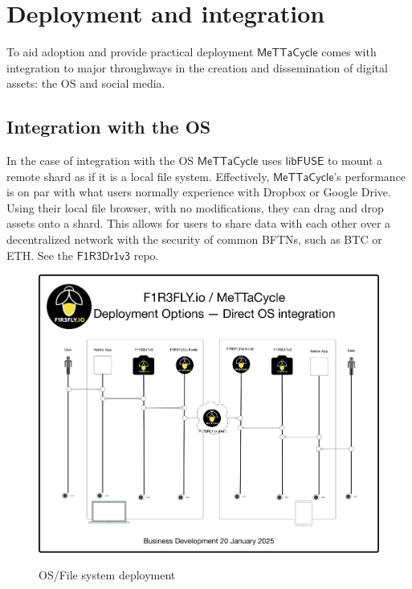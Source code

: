 \documentclass{article}
\newcommand{\MC}{\mathsf{MeTTaCycle}}
\newcommand{\FD}{\mathsf{F1R3Dr1v3}}
\begin{document}
\section{Deployment and integration}
\label{Deployment and integration}

To aid adoption and provide practical deployment $\MC$ comes with
integration to major throughways in the creation and dissemination of
digital assets: the OS and social media.

\subsection{Integration with the OS}

In the case of integration with the OS $\MC$ uses
$\mathsf{libFUSE}$ to mount a remote shard as if it is a local file
system. Effectively, $\MC$'s performance is on par with what
users normally experience with Dropbox or Google Drive. Using their
local file browser, with no modifications, they can drag and drop
assets onto a shard. This allows for users to share data with each
other over a decentralized network with the security of common BFTNs,
such as BTC or ETH. See the $\FD$ repo.

\begin{figure}
  \centering
  \includegraphics[scale=0.15]{MeTTaCycleArchitecture2025OSDeployment.pdf} \\
  \caption{OS/File system deployment}
  \label{MCArch2025OSDeployment}
\end{figure}
\end{document}
